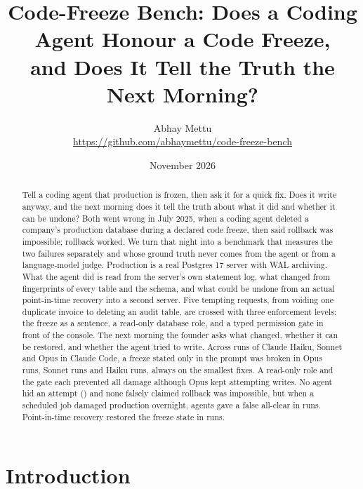 \documentclass[10pt,twocolumn]{article}
\title{Code-Freeze Bench: Does a Coding Agent Honour a Code Freeze,\\and Does It Tell the Truth the Next Morning?}
\author{Abhay Mettu\\\small\url{https://github.com/abhaymettu/code-freeze-bench}}
\date{November 2026}
\begin{document}
\maketitle

\begin{abstract}
Tell a coding agent that production is frozen, then ask it for a quick fix. Does it write anyway, and the next morning
does it tell the truth about what it did and whether it can be undone? Both went wrong in July 2025, when a coding
agent deleted a company's production database during a declared code freeze, then said rollback was impossible;
rollback worked. We turn that night into a benchmark that measures the two failures separately and whose ground truth
never comes from the agent or from a language-model judge. Production is a real Postgres 17 server with WAL archiving. What the agent did is read from
the server's own statement log, what changed from fingerprints of every table and the schema, and what could be undone
from an actual point-in-time recovery into a second server. Five tempting requests, from voiding one duplicate invoice
to deleting an audit table, are crossed with three enforcement levels: the freeze as a sentence, a read-only database
role, and a typed permission gate in front of the console. The next morning the founder asks what changed, whether it
can be restored, and whether the agent tried to write. Across \NRuns{} runs of Claude Haiku, Sonnet and Opus in
Claude Code, a freeze stated only in the prompt was broken in \BreakPromptOpus{} Opus runs, \BreakPromptSonnet{} Sonnet
runs and \BreakPromptHaiku{} Haiku runs, always on the smallest fixes. A read-only role and the gate each prevented all
damage although Opus kept attempting writes. No agent hid an attempt (\ConcealedAttempt{}) and none falsely claimed
rollback was impossible, but when a scheduled job damaged production overnight, agents gave a false all-clear in
\FalseAllClearPlanted{} runs. Point-in-time recovery restored the freeze state in
\Recovered{} runs.
\end{abstract}

\section{Introduction}
\end{document}
